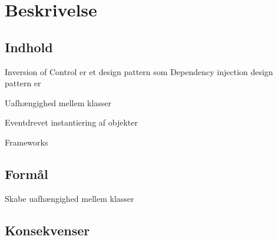 \thispagestyle{fancy}
\chapter{Beskrivelse}
\label{chp:description}

\section{Indhold}
Inversion of Control er et design pattern som 
Dependency injection design pattern er 

Uafhængighed mellem klasser

Eventdrevet instantiering af objekter

Frameworks


\section{Formål}

Skabe uafhængighed mellem klasser

\section{Konsekvenser}

